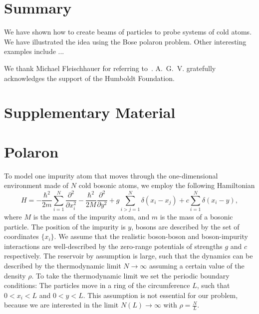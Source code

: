 \documentclass[twocolumn,amsmath,amssymb,showpacs,prl,superscriptaddress,aps]{revtex4-1}
\begin{document}
\section{Summary} 

We have shown how to create beams of particles to probe systems of cold atoms. We have illustrated the idea using the Bose polaron problem. Other interesting examples include ... 

\begin{acknowledgments}
We thank Michael Fleischhauer for referring to~\cite{paper}.
A.~G.~V. gratefully acknowledges the support of the Humboldt Foundation.
\end{acknowledgments}

\widetext

\section{Supplementary Material}

\section{Polaron}

To model one impurity atom that moves through the one-dimensional environment made of $N$ cold bosonic atoms, we employ the following Hamiltonian
\begin{equation}
H=-\frac{\hbar^2}{2m}\sum_{i=1}^N\frac{\partial^2}{\partial x_i^2}-\frac{\hbar^2}{2M}\frac{\partial^2}{\partial y^2}+g\sum_{i>j=1}^N\delta(x_i-x_j)+c\sum_{i=1}^N \delta(x_i-y),
\end{equation}
where $M$ is the mass of the impurity atom, and $m$ is the mass of a bosonic particle. The position of the impurity is $y$, bosons are described by the set of coordinates $\{x_i\}$. 
We assume that the realistic boson-boson and boson-impurity interactions are well-described by the zero-range potentials of strengths $g$ and $c$ respectively. 
The reservoir by assumption is large, such that the dynamics can be described by the thermodynamic limit $N\to \infty$ assuming a certain value of the density $\rho$.
To take the thermodynamic limit we set the periodic boundary conditions: The particles move in a ring of the circumference $L$, such that $0<x_i<L$ and $0<y<L$.
This assumption is not essential for our problem, because we are interested in the limit $N(L)\to \infty$ with $\rho=\frac{N}{L}$.
\end{document}
